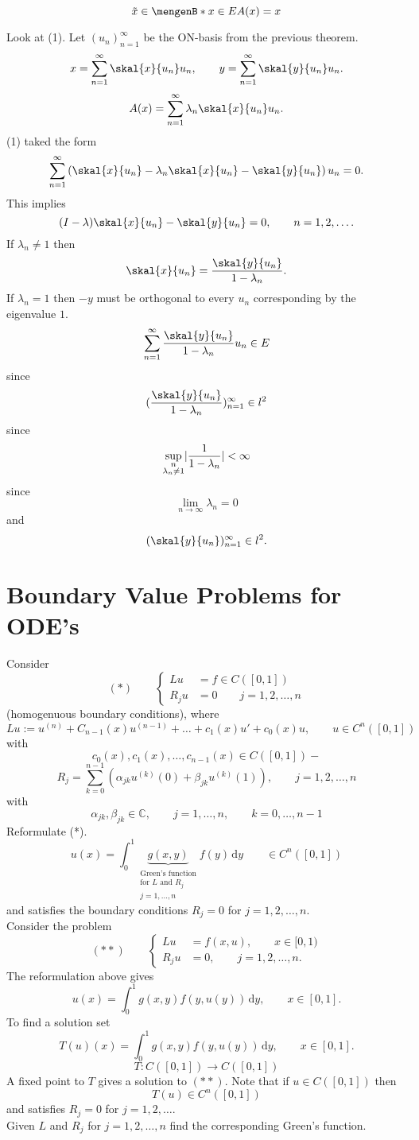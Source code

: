 \[
	\tilde x \in \set[x \in E]{A(x)=x}
\]
\begin{beweis}
	Look at (1). Let $(u_n)_{n=1}^{\infty}$ be the ON-basis from the previous theorem.
	\[
		x = \sum_{n=1}^{\infty}\skal{x}{u_n}u_n, \qquad y = \sum_{n=1}^{\infty}\skal{y}{u_n}u_n.
	\]
	\[
		A(x) = \sum_{n=1}^{\infty} \lambda_n \skal{x}{u_n}u_n.
	\]
	(1) taked the form
	\[
		\sum_{n=1}^{\infty} \left( \skal{x}{u_n} - \lambda_n \skal{x}{u_n} - \skal{y}{u_n} \right) u_n = 0.
	\]
	This implies 
	\[
		(I- \lambda)\skal{x}{u_n}- \skal{y}{u_n} = 0, \qquad n=1,2,\dots.
	\]
	If $\lambda_n \neq 1$ then
	\[
		\skal{x}{u_n} = \frac{\skal{y}{u_n}}{1 - \lambda_n}.
	\]
	If $\lambda_n = 1$ then $-y$ must be orthogonal to every $u_n$ corresponding by the eigenvalue $1$.
	\[
		\sum_{n=1}^{\infty} \frac{\skal{y}{u_n}}{1- \lambda_n}u_n \in E
	\]
	since
	\[
		(\frac{\skal{y}{u_n}}{1- \lambda_n})_{n=1}^{\infty} \in l^2
	\]
	since
	\[
		\sup_{\substack{n \\ \lambda_n \neq 1}} \lvert\frac{1}{1- \lambda_n}\rvert < \infty
	\]
	since
	\[
		\lim_{n \to \infty}\lambda_n = 0
	\]
	and
	\[
		(\skal{y}{u_n})_{n=1}^{\infty} \in l^2.
	\]
\end{beweis}

\section{Boundary Value Problems for ODE's} 
\label{sec:boundary_value_problems_for_ode_s}
Consider
\[
	(*)\qquad \begin{cases}
		Lu &=f \in C([0,1]) \\
		R_ju &= 0 \qquad j=1,2,\dots,n 
	\end{cases}
\]
(homogenuous boundary conditions),
where
\[
	Lu := u^{(n)} + C_{n-1}(x)u^{(n-1)} + \dots + c_1(x)u' + c_0(x)u, \qquad u \in C^n([0,1])
\]
with
\[
	c_0(x),c_1(x), \dots, c_{n-1}(x) \in C([0,1])-
\]
\[
	R_j = \sum_{k=0}^{n-1} \left( \alpha_{jk} u^{(k)}(0) + \beta_{jk}u^{(k)}(1) \right), \qquad j=1,2,\dots,n
\]
with
\[
	\alpha_{jk}, \beta_{jk} \in \mathbb{C}, \qquad j=1,\dots,n, \qquad k=0,\dots,n-1
\]
Reformulate (*).
\[
	u(x) = \int_{0}^{1} \underset{\substack{\text{Green's function} \\ \text{for $L$ and $R_j$} \\ j=1,\dots,n}}{\underbrace{g(x,y)}}f(y) \,\mathrm{d}y \qquad \in C^n([0,1])
\]
and satisfies the boundary conditions $R_j = 0$ for $j=1,2,\dots,n$. \\
Consider the problem
\[
(**) \qquad 	\begin{cases}
		Lu &= f(x,u), \qquad x \in [0,1) \\
		R_ju &= 0, \qquad j=1,2,\dots,n.
		
	\end{cases}
\]
The reformulation above gives
\[
	u(x) = \int_{0}^{1}g(x,y)f(y,u(y)) \,\mathrm{d}y, \qquad x \in [0,1].
\]
To find a solution set
\[
	T(u)(x) = \int_{0}^{1}g(x,y)f(y,u(y)) \,\mathrm{d}y, \qquad x \in [0,1].
\]
\[
	T: C([0,1]) \to C([0,1])
\]
A fixed point to $T$ gives a solution to $(**)$. Note that if $u \in C([0,1])$ then
\[
	T(u) \in C^n([0,1]) 
\]
and satisfies $R_j=0$ for $j=1,2,\dots$. \\
Given $L$ and $R_j$ for $j=1,2,\dots,n$ find the corresponding Green's function.

